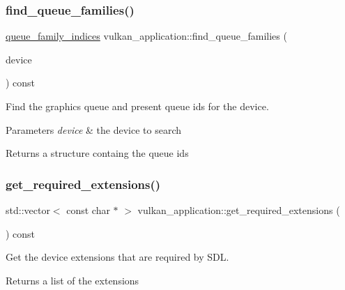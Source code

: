 \subsubsection{\texorpdfstring{find\+\_\+queue\+\_\+families()}{find\_queue\_families()}}
{\footnotesize\ttfamily \mbox{\hyperlink{structqueue__family__indices}{queue\+\_\+family\+\_\+indices}} vulkan\+\_\+application\+::find\+\_\+queue\+\_\+families (\begin{DoxyParamCaption}\item[{const Vk\+Physical\+Device}]{device }\end{DoxyParamCaption}) const\hspace{0.3cm}{\ttfamily [private]}}



Find the graphics queue and present queue id\textquotesingle{}s for the device. 


\begin{DoxyParams}{Parameters}
{\em device} & the device to search \\
\hline
\end{DoxyParams}
\begin{DoxyReturn}{Returns}
a structure containg the queue id\textquotesingle{}s 
\end{DoxyReturn}
\mbox{\label{classvulkan__application_ac11d2776b4aceb5c69b397bd474c5955}} 
\subsubsection{\texorpdfstring{get\+\_\+required\+\_\+extensions()}{get\_required\_extensions()}}
{\footnotesize\ttfamily std\+::vector$<$ const char $\ast$ $>$ vulkan\+\_\+application\+::get\+\_\+required\+\_\+extensions (\begin{DoxyParamCaption}{ }\end{DoxyParamCaption}) const\hspace{0.3cm}{\ttfamily [private]}}



Get the device extensions that are required by S\+DL. 

\begin{DoxyReturn}{Returns}
a list of the extensions 
\end{DoxyReturn}
\mbox{\label{classvulkan__application_a0b5da10a731df21511bee740e7222d83}} 
